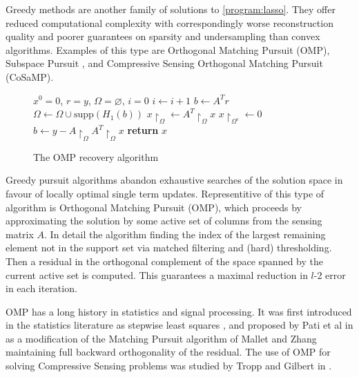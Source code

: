 
Greedy methods are another family of solutions to \ref{program:lasso}. They offer reduced computational complexity with correspondingly worse reconstruction quality and poorer guarantees on sparsity and undersampling than convex algorithms. Examples of this type are Orthogonal Matching Pursuit (OMP)\cite{tropp2007signal}, Subspace Pursuit \cite{dai2009subspace}, and Compressive Sensing Orthogonal Matching Pursuit (CoSaMP). 


\begin{figure}
\begin{algorithmic}[1]
\State $x^0 = 0$, $r=y$, $\Omega = \varnothing$, $i=0$
\State $i \gets i+1$
\State $b\gets A^Tr$
\State $\Omega \gets \Omega \cup \mathrm{supp}\left(H_1\left(b\right)\right)$
\State $x\restriction_{\Omega} \gets A^T\restriction_{\Omega}x$
\State $x\restriction_{\Omega^c} \gets 0$
\State $b \gets y - A\restriction_{\Omega} A^T\restriction_{\Omega}x$
\EndWhile
\State \textbf{return} $x$
\EndProcedure
\end{algorithmic}
\caption{The OMP recovery algorithm}\label{alg:omp}
\end{figure}

Greedy pursuit algorithms abandon exhaustive searches of the solution space in favour of locally optimal single term updates. Representitive of this type of algorithm is Orthogonal Matching Pursuit (OMP), which proceeds by approximating the solution by some active set of columns from the sensing matrix \(A\). In detail the algorithm finding the index of the largest remaining element not in the support set via matched filtering and (hard) thresholding. Then a residual in the orthogonal complement of the space spanned by the current active set is computed. This guarantees a maximal reduction in \(l\)-2 error in each iteration.

OMP has a long history in statistics and signal processing. It was first introduced in the statistics literature as stepwise least squares \cite{goldberger1961stepwise}, and proposed by Pati et al in \cite{pati1993orthogonal} as a modification of the Matching Pursuit algorithm of Mallet and Zhang \cite{mallat1993matching} maintaining full backward orthogonality of the residual. The use of OMP for solving Compressive Sensing problems was studied by Tropp and Gilbert in \cite{tropp2007signal}. 

